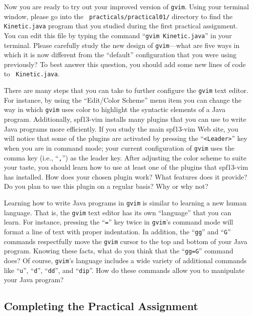 Now you are ready to try out your improved version of {\tt gvim}.  Using your terminal window, please go into the {\tt
  practicals/practical01/} directory to find the {\tt Kinetic.java} program that you studied during the first practical
assignment. You can edit this file by typing the command ``{\tt gvim Kinetic.java}'' in your terminal. Please carefully
study the new design of {\tt gvim}---what are five ways in which it is now different from the ``default'' configuration
that you were using previously? To best answer this question, you should add some new lines of code to {\tt
  Kinetic.java}.

There are many steps that you can take to further configure the {\tt gvim} text editor.  For instance, by using the
``Edit/Color Scheme'' menu item you can change the way in which {\tt gvim} uses color to highlight the syntactic
elements of a Java program. Additionally, spf13-vim installs many plugins that you can use to write Java programs more
efficiently.  If you study the main spf13-vim Web site, you will notice that some of the plugins are activated by
pressing the ``{\tt <Leader>}'' key when you are in command mode; your current configuration of {\tt gvim} uses the
comma key (i.e., ``{\tt ,}'') as the leader key. After adjusting the color scheme to suite your taste, you should learn
how to use at least one of the plugins that spf13-vim has installed.  How does your chosen plugin work?  What features
does it provide? Do you plan to use this plugin on a regular basis? Why or why not? 

Learning how to write Java programs in {\tt gvim} is similar to learning a new human language.  That is, the {\tt gvim}
text editor has its own ``language'' that you can learn.  For instance, pressing the ``{\tt =}'' key twice in {\tt gvim}'s
command mode will format a line of text with proper indentation.  In addition, the ``{\tt gg}'' and ``{\tt G}'' commands
respectfully move the {\tt gvim} cursor to the top and bottom of your Java program.  Knowing these facts, what do you
think that the ``{\tt gg=G}'' command does? Of course, {\tt gvim}'s language includes a wide variety of additional
commands like ``{\tt u}'', ``{\tt d}'', ``{\tt dd}'', and ``{\tt dip}''.  How do these commands allow you to manipulate
your Java program?

\vspace*{-.15in}
\subsection*{Completing the Practical Assignment}
\vspace*{-.1in}

